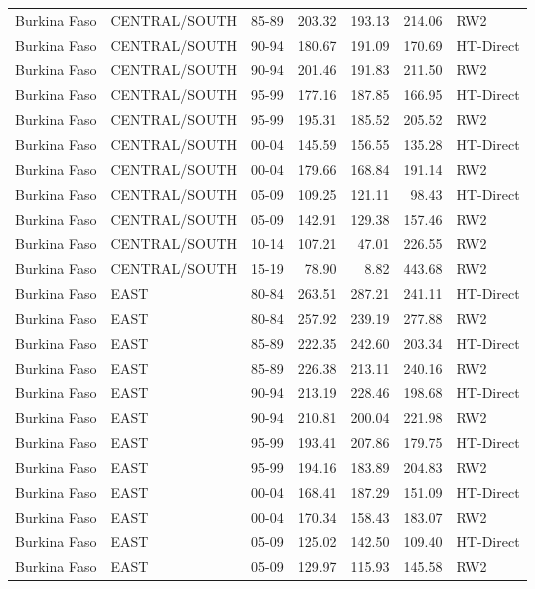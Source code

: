 \begin{longtable}{lllrrrl}
  Burkina Faso & CENTRAL/SOUTH & 85-89 & 203.32 & 193.13 & 214.06 & RW2 \\ 
  Burkina Faso & CENTRAL/SOUTH & 90-94 & 180.67 & 191.09 & 170.69 & HT-Direct \\ 
  Burkina Faso & CENTRAL/SOUTH & 90-94 & 201.46 & 191.83 & 211.50 & RW2 \\ 
  Burkina Faso & CENTRAL/SOUTH & 95-99 & 177.16 & 187.85 & 166.95 & HT-Direct \\ 
  Burkina Faso & CENTRAL/SOUTH & 95-99 & 195.31 & 185.52 & 205.52 & RW2 \\ 
  Burkina Faso & CENTRAL/SOUTH & 00-04 & 145.59 & 156.55 & 135.28 & HT-Direct \\ 
  Burkina Faso & CENTRAL/SOUTH & 00-04 & 179.66 & 168.84 & 191.14 & RW2 \\ 
  Burkina Faso & CENTRAL/SOUTH & 05-09 & 109.25 & 121.11 & 98.43 & HT-Direct \\ 
  Burkina Faso & CENTRAL/SOUTH & 05-09 & 142.91 & 129.38 & 157.46 & RW2 \\ 
  Burkina Faso & CENTRAL/SOUTH & 10-14 & 107.21 & 47.01 & 226.55 & RW2 \\ 
  Burkina Faso & CENTRAL/SOUTH & 15-19 & 78.90 & 8.82 & 443.68 & RW2 \\ 
  Burkina Faso & EAST & 80-84 & 263.51 & 287.21 & 241.11 & HT-Direct \\ 
  Burkina Faso & EAST & 80-84 & 257.92 & 239.19 & 277.88 & RW2 \\ 
  Burkina Faso & EAST & 85-89 & 222.35 & 242.60 & 203.34 & HT-Direct \\ 
  Burkina Faso & EAST & 85-89 & 226.38 & 213.11 & 240.16 & RW2 \\ 
  Burkina Faso & EAST & 90-94 & 213.19 & 228.46 & 198.68 & HT-Direct \\ 
  Burkina Faso & EAST & 90-94 & 210.81 & 200.04 & 221.98 & RW2 \\ 
  Burkina Faso & EAST & 95-99 & 193.41 & 207.86 & 179.75 & HT-Direct \\ 
  Burkina Faso & EAST & 95-99 & 194.16 & 183.89 & 204.83 & RW2 \\ 
  Burkina Faso & EAST & 00-04 & 168.41 & 187.29 & 151.09 & HT-Direct \\ 
  Burkina Faso & EAST & 00-04 & 170.34 & 158.43 & 183.07 & RW2 \\ 
  Burkina Faso & EAST & 05-09 & 125.02 & 142.50 & 109.40 & HT-Direct \\ 
  Burkina Faso & EAST & 05-09 & 129.97 & 115.93 & 145.58 & RW2 \\ 

\end{longtable}
